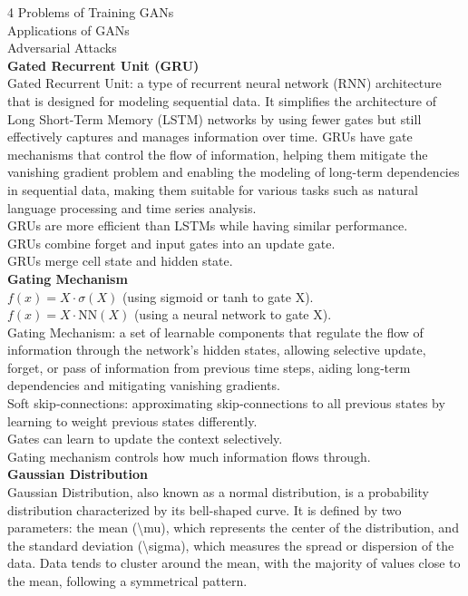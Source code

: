 \documentclass[8pt]{extarticle}
\begin{document}
\begin{multicols}{4}
Problems of Training GANs\\
Applications of GANs\\
Adversarial Attacks\\
\vspace{2pt}\textbf{Gated Recurrent Unit (GRU)}\\
Gated Recurrent Unit: a type of recurrent neural network (RNN) architecture that is designed for modeling sequential data. It simplifies the architecture of Long Short-Term Memory (LSTM) networks by using fewer gates but still effectively captures and manages information over time. GRUs have gate mechanisms that control the flow of information, helping them mitigate the vanishing gradient problem and enabling the modeling of long-term dependencies in sequential data, making them suitable for various tasks such as natural language processing and time series analysis.\\
GRUs are more efficient than LSTMs while having similar performance.\\
GRUs combine forget and input gates into an update gate.\\
GRUs merge cell state and hidden state.\\
\vspace{2pt}\textbf{Gating Mechanism}\\
$f(x) = X \cdot \sigma(X)$ (using sigmoid or tanh to gate X).\\
$f(x) = X \cdot \text{NN}(X)$ (using a neural network to gate X).\\
Gating Mechanism: a set of learnable components that regulate the flow of information through the network’s hidden states, allowing selective update, forget, or pass of information from previous time steps, aiding long‑term dependencies and mitigating vanishing gradients.\\
Soft skip‑connections: approximating skip‑connections to all previous states by learning to weight previous states differently.\\
Gates can learn to update the context selectively.\\
Gating mechanism controls how much information flows through.\\
\vspace{2pt}\textbf{Gaussian Distribution}\\
Gaussian Distribution, also known as a normal distribution, is a probability distribution characterized by its bell-shaped curve. It is defined by two parameters: the mean (\textbackslash{}mu), which represents the center of the distribution, and the standard deviation (\textbackslash{}sigma), which measures the spread or dispersion of the data. Data tends to cluster around the mean, with the majority of values close to the mean, following a symmetrical pattern.\\

\end{multicols}
\end{document}
